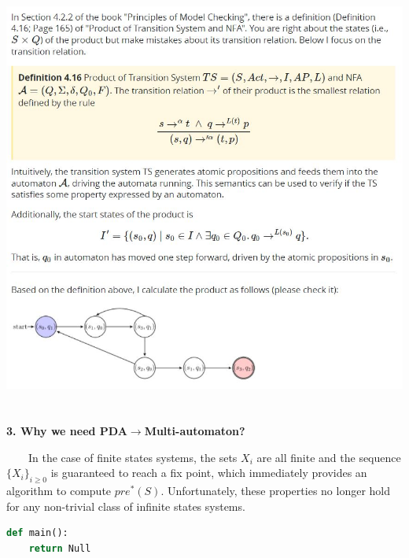 \documentclass{sciposter}
\begin{document}
\begin{multicols}{3}
    \includegraphics{figures/1-1-answer.jpg}~\\[1cm]
    \\
    
    \textbf{3. Why we need PDA$\rightarrow$Multi-automaton?}
    
    ~~~~In the case of finite states systems, the sets $X_i$ are all finite and the sequence $\{X_i\}_{i\geq 0}$ is guaranteed to reach a fix point, which immediately provides an algorithm to compute $pre^*(S)$. Unfortunately, these properties no longer hold for any non-trivial class of infinite states systems. 

\begin{lstlisting}[language=Python]
def main():
	return Null
\end{lstlisting}


\end{multicols}
\end{document}
